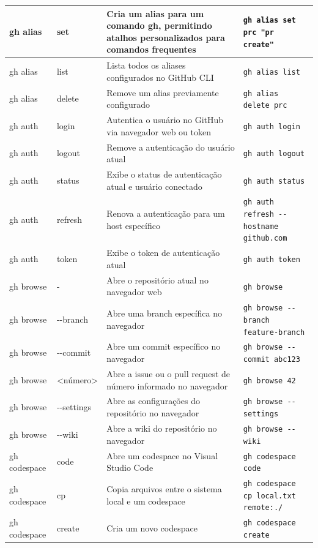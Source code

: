 \begin{longtable}{|p{2cm}|p{2.3cm}|p{4cm}|p{6cm}|}
    gh alias & set & Cria um alias para um comando gh, permitindo atalhos personalizados para comandos frequentes & \texttt{gh alias set prc "pr create"} \\
    \hline
    gh alias & list & Lista todos os aliases configurados no GitHub CLI & \texttt{gh alias list} \\
    \hline
    gh alias & delete & Remove um alias previamente configurado & \texttt{gh alias delete prc} \\
    \hline
    gh auth & login & Autentica o usuário no GitHub via navegador web ou token & \texttt{gh auth login} \\
    \hline
    gh auth & logout & Remove a autenticação do usuário atual & \texttt{gh auth logout} \\
    \hline
    gh auth & status & Exibe o status de autenticação atual e usuário conectado & \texttt{gh auth status} \\
    \hline
    gh auth & refresh & Renova a autenticação para um host específico & \texttt{gh auth refresh -{-}hostname github.com} \\
    \hline
    gh auth & token & Exibe o token de autenticação atual & \texttt{gh auth token} \\
    \hline
    gh browse & - & Abre o repositório atual no navegador web & \texttt{gh browse} \\
    \hline
    gh browse & -{-}branch & Abre uma branch específica no navegador & \texttt{gh browse -{-}branch feature-branch} \\
    \hline
    gh browse & -{-}commit & Abre um commit específico no navegador & \texttt{gh browse -{-}commit abc123} \\
    \hline
    gh browse & <número> & Abre a issue ou o pull request de número informado no navegador & \texttt{gh browse 42} \\
    \hline
    gh browse & -{-}settings & Abre as configurações do repositório no navegador & \texttt{gh browse -{-}settings} \\
    \hline
    gh browse & -{-}wiki & Abre a wiki do repositório no navegador & \texttt{gh browse -{-}wiki} \\
    \hline
    gh codespace & code & Abre um codespace no Visual Studio Code & \texttt{gh codespace code} \\
    \hline
    gh codespace & cp & Copia arquivos entre o sistema local e um codespace & \texttt{gh codespace cp local.txt remote:./} \\
    \hline
    gh codespace & create & Cria um novo codespace & \texttt{gh codespace create} \\

\end{longtable}
